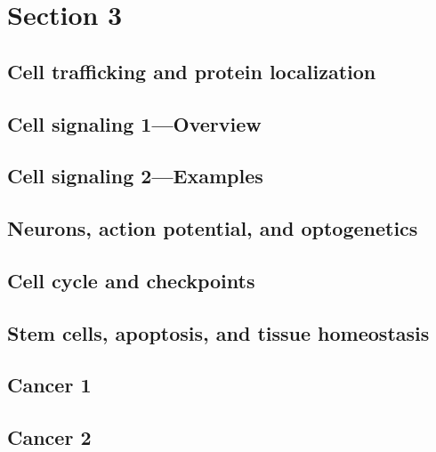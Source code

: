 \documentclass[../bio.tex]{subfiles}
\begin{document}
\chapter{Section 3}
\section{Cell trafficking and protein localization}
\section{Cell signaling 1—Overview}
\section{Cell signaling 2—Examples}
\section{Neurons, action potential, and optogenetics}
\section{Cell cycle and checkpoints}
\section{Stem cells, apoptosis, and tissue homeostasis}
\section{Cancer 1}
\section{Cancer 2}
\end{document}
